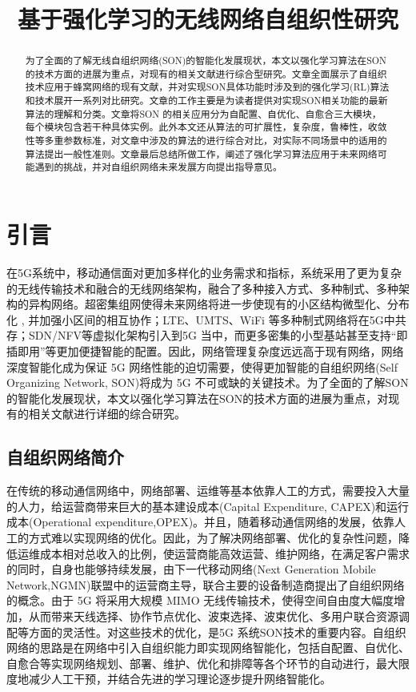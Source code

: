 ﻿\documentclass[11pt,draftclsnofoot,onecolumn,journal,letterpaper]{IEEEtran}
\begin{document}
\title{基于强化学习的无线网络自组织性研究}
\maketitle

\begin{abstract}
为了全面的了解无线自组织网络(SON)的智能化发展现状，本文以强化学习算法在SON的技术方面的进展为重点，对现有的相关文献进行综合型研究。文章全面展示了自组织技术应用于蜂窝网络的现有文献，并对实现SON具体功能时涉及到的强化学习(RL)算法和技术展开一系列对比研究。文章的工作主要是为读者提供对实现SON相关功能的最新算法的理解和分类。文章将SON 的相关应用分为自配置、自优化、自愈合三大模块，每个模块包含若干种具体实例。此外本文还从算法的可扩展性，复杂度，鲁棒性，收敛性等多重参数标准，对文章中涉及的算法的进行综合对比，对实际不同场景中的适用的算法提出一般性准则。文章最后总结所做工作，阐述了强化学习算法应用于未来网络可能遇到的挑战，并对自组织网络未来发展方向提出指导意见。
\end{abstract}

\section{引言}
在5G系统中，移动通信面对更加多样化的业务需求和指标，系统采用了更为复杂的无线传输技术和融合的无线网络架构，融合了多种接入方式、多种制式、多种架构的异构网络。超密集组网使得未来网络将进一步使现有的小区结构微型化、分布化 , 并加强小区间的相互协作；LTE、UMTS、WiFi 等多种制式网络将在5G中共存；SDN/NFV等虚拟化架构引入到5G 当中，而更多密集的小型基站甚至支持“即插即用”等更加便捷智能的配置。因此，网络管理复杂度远远高于现有网络，网络深度智能化成为保证 5G 网络性能的迫切需要，使得更加智能的自组织网络(Self Organizing Network, SON)将成为 5G 不可或缺的关键技术。为了全面的了解SON的智能化发展现状，本文以强化学习算法在SON的技术方面的进展为重点，对现有的相关文献进行详细的综合研究。

\subsection{自组织网络简介}


在传统的移动通信网络中，网络部署、运维等基本依靠人工的方式，需要投入大量的人力，给运营商带来巨大的基本建设成本(Capital Expenditure, CAPEX)和运行成本(Operational expenditure,OPEX)。并且，随着移动通信网络的发展，依靠人工的方式难以实现网络的优化。因此，为了解决网络部署、优化的复杂性问题，降低运维成本相对总收入的比例，使运营商能高效运营、维护网络，在满足客户需求的同时，自身也能够持续发展，由下一代移动网络(Next Generation Mobile Network,NGMN)联盟中的运营商主导，联合主要的设备制造商提出了自组织网络的概念\cite{Alliance2008}。由于 5G 将采用大规模 MIMO 无线传输技术，使得空间自由度大幅度增加，从而带来天线选择、协作节点优化、波束选择、波束优化、多用户联合资源调配等方面的灵活性。对这些技术的优化，是5G 系统SON技术的重要内容。自组织网络的思路是在网络中引入自组织能力即实现网络智能化，包括自配置、自优化、自愈合等实现网络规划、部署、维护、优化和排障等各个环节的自动进行，最大限度地减少人工干预，并结合先进的学习理论逐步提升网络智能化。
\end{document}

